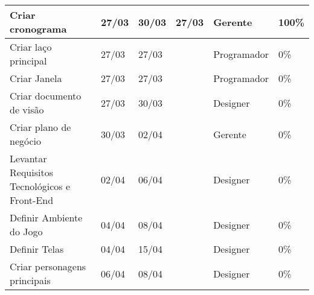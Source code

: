 \documentclass[a4paper, 11pt]{article} %
\begin{document}
\begin{table}[h]
\begin{tabular}{|l|l|l|l|l|l|}
Criar cronograma                             & 27/03                                & 30/03                             & 27/03                                   & Gerente                                   & 100\%                                   \\ \hline
Criar laço principal                         & 27/03                                & 27/03                             &                                         & Programador                               & 0\%                                     \\ \hline
Criar Janela                                 & 27/03                                & 27/03                             &                                         & Programador                               & 0\%                                     \\ \hline
Criar documento de visão                     & 27/03                                & 30/03                             &                                         & Designer                                  & 0\%                                     \\ \hline
Criar plano de negócio                       & 30/03                                & 02/04                             &                                         & Gerente                                   & 0\%                                     \\ \hline
Levantar Requisitos Tecnológicos e Front-End & 02/04                                & 06/04                             &                                         & Designer                                  & 0\%                                     \\ \hline
Definir Ambiente do Jogo                     & 04/04                                & 08/04                             &                                         & Designer                                  & 0\%                                     \\ \hline
Definir Telas                                & 04/04                                & 15/04                             &                                         & Designer                                  & 0\%                                     \\ \hline
Criar personagens principais                 & 06/04                                & 08/04                             &                                         & Designer                                  & 0\%                                     \\ \hline

\end{tabular}
\end{table}
\end{document}

